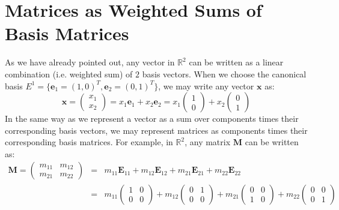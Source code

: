 \section{Matrices as Weighted Sums of Basis Matrices}
As we have already pointed out, any vector in $\mathbb{R}^2$ can be written as a linear combination (i.e. weighted sum) of $2$ basis vectors. When we choose the canonical basis $E^1 = \{\mathbf{e}_1 = (1, 0)^T, \mathbf{e}_2 = (0, 1)^T\}$, we may write any vector $\mathbf{x}$ as:
\begin{equation}
 \mathbf{x} 
 =
 \begin{pmatrix} 
  x_1 \\
  x_2
 \end{pmatrix}
 =
 x_1 \mathbf{e}_1 + x_2 \mathbf{e}_2
 = 
 x_1  
 \begin{pmatrix} 
  1 \\
  0
 \end{pmatrix}
 +
 x_2  
 \begin{pmatrix} 
  0 \\
  1
 \end{pmatrix} 
\end{equation}
In the same way as we represent a vector as a sum over components times their corresponding basis vectors, we may represent matrices as components times their corresponding basis matrices. For example, in $\mathbb{R}^2$, any matrix $\mathbf{M}$ can be written as:
\begin{eqnarray}
 \mathbf{M} 
 =
 \begin{pmatrix} 
  m_{11} & m_{12} \\
  m_{21} & m_{22}
 \end{pmatrix}
 &=&
 m_{11} \mathbf{E}_{11} + m_{12} \mathbf{E}_{12} + m_{21} \mathbf{E}_{21} + m_{22} \mathbf{E}_{22} \\
 &=& 
 m_{11}  
 \begin{pmatrix} 
  1 & 0 \\
  0 & 0
 \end{pmatrix}
 +
 m_{12}  
 \begin{pmatrix} 
  0 & 1 \\
  0 & 0
 \end{pmatrix} 
 +
 m_{21}  
 \begin{pmatrix} 
  0 & 0 \\
  1 & 0
 \end{pmatrix}
 +
 m_{22}  
 \begin{pmatrix} 
  0 & 0 \\
  0 & 1
 \end{pmatrix}  
\end{eqnarray}
